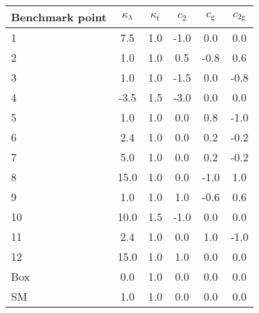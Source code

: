 \documentclass[border=5pt]{standalone}
\begin{document}
  \minipage{18cm}

  \centering
  \small
  
  \begin{tabular}{l c c c c c }
\hline
Benchmark point & $\kappa_\lambda$ &
$\kappa_\textrm{t}$ & $c_2$ & $c_\textrm{g}$ & $c_\textrm{2g}$ \\
\hline
1 & 7.5 & 1.0 & -1.0 & 0.0 & 0.0 \\
2  & 1.0 & 1.0 & 0.5 & -0.8 & 0.6\\
3 & 1.0 & 1.0 & -1.5 & 0.0 & -0.8\\
4 & -3.5 & 1.5 & -3.0 & 0.0 & 0.0\\
5  & 1.0 & 1.0 & 0.0 & 0.8 & -1.0\\
6  & 2.4 & 1.0 & 0.0 & 0.2 & -0.2\\
7 & 5.0 & 1.0 & 0.0 & 0.2 & -0.2\\
8 & 15.0 & 1.0 & 0.0 & -1.0 & 1.0\\
9 & 1.0 & 1.0 & 1.0 & -0.6 & 0.6  \\
10 & 10.0 & 1.5 & -1.0 & 0.0 & 0.0\\
11  & 2.4 & 1.0 & 0.0 & 1.0 & -1.0\\
12 & 15.0 & 1.0 & 1.0 & 0.0 & 0.0 \\
Box & 0.0 & 1.0 & 0.0 & 0.0 & 0.0 \\
\hline
SM & 1.0 & 1.0 & 0.0 & 0.0 & 0.0 \\
\hline
\end{tabular}

  \endminipage
\end{document}
